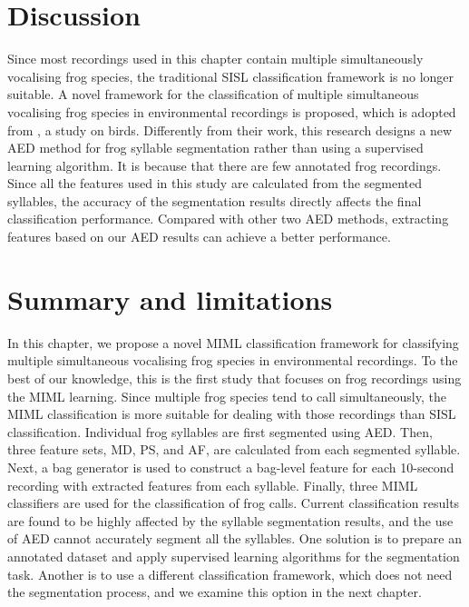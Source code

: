 \section{Discussion}
Since most recordings used in this chapter contain multiple simultaneously vocalising frog species, the traditional SISL classification framework is no longer suitable. A novel framework for the classification of multiple simultaneous vocalising frog species in environmental recordings is proposed, which is adopted from \citep{briggs2012acoustic}, a study on birds. Differently from their work, this research designs a new AED method for frog syllable segmentation rather than using a supervised learning algorithm. It is because that there are few annotated frog recordings. Since all the features used in this study are calculated from the segmented syllables, the accuracy of the segmentation results directly affects the final classification performance. Compared with other two AED methods, extracting features based on our AED results can achieve a better performance.


\section{Summary and limitations}
In this chapter, we propose a novel MIML classification framework for classifying multiple simultaneous vocalising frog species in environmental recordings. To the best of our knowledge, this is the first study that focuses on frog recordings using the MIML learning. Since multiple frog species tend to call simultaneously, the MIML classification is more suitable for dealing with those recordings than SISL classification. Individual frog syllables are first segmented using AED. Then, three feature sets, MD, PS, and AF, are calculated from each segmented syllable. Next, a bag generator is used to construct a bag-level feature for each 10-second recording with extracted features from each syllable. Finally, three MIML classifiers are used for the classification of frog calls. Current classification results are found to be highly affected by the syllable segmentation results, and the use of AED cannot accurately segment all the syllables. One solution is to prepare an annotated dataset and apply supervised learning algorithms for the segmentation task. Another is to use a different classification framework, which does not need the segmentation process, and we examine this option in the next chapter.


